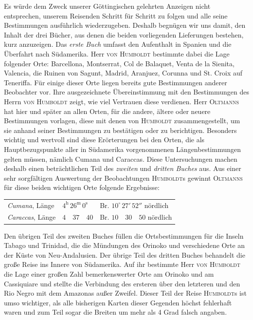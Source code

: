 Es würde dem Zweck unserer Göttingischen gelehrten Anzeigen nicht entsprechen, unserem Reisenden Schritt für Schritt zu folgen und alle seine Bestimmungen ausführlich wiederzugeben. Deshalb begnügen wir uns damit, den Inhalt der drei Bücher, aus denen die beiden vorliegenden Lieferungen bestehen, kurz anzuzeigen. Das \emph{erste Buch} umfasst den Aufenthalt in Spanien und die Überfahrt nach Südamerika. Herr \textsc{von Humboldt} bestimmte dabei die Lage folgender Orte: Barcellona, Montserrat, Col de Balaquet, Venta de la Sienita, Valencia, die Ruinen von Sagunt, Madrid, Aranjuez, Corunna und St. Croix auf Teneriffa. Für einige dieser Orte liegen bereits gute Bestimmungen anderer Beobachter vor. Ihre ausgezeichnete Übereinstimmung mit den Bestimmungen des Herrn \textsc{von Humboldt} zeigt, wie viel Vertrauen diese verdienen. Herr \textsc{Oltmanns} hat hier und später an allen Orten, für die andere, ältere oder neuere Bestimmungen vorlagen, diese mit denen von \textsc{Humboldt} zusammengestellt, um sie anhand seiner Bestimmungen zu bestätigen oder zu berichtigen. Besonders wichtig und wertvoll sind diese Erörterungen bei den Orten, die als Hauptbezugspunkte aller in Südamerika vorgenommenen Längenbestimmungen gelten müssen, nämlich Cumana und Caraccas. Diese Untersuchungen machen deshalb einen beträchtlichen Teil des \emph{zweiten} und \emph{dritten Buches} aus. Aus einer sehr sorgfältigen Auswertung der Beobachtungen \textsc{Humboldt}s gewinnt \textsc{Oltmanns} für diese beiden wichtigen Orte folgende Ergebnisse:
\begin{center} \begin{tabular}{@{}lll@{}} \textit{Cumana}, Länge & $4^{\mathrm h}\,26^{\mathrm m}\,0^{\mathrm s}$ & Br. $10^\circ\,27'\,52''$ nördlich \\ \textit{Caraccas}, Länge & $4\quad 37\quad 40$ & Br. $10\quad 30\quad 50$ nördlich \\ \end{tabular} \end{center}
\noindent Den übrigen Teil des zweiten Buches füllen die Ortsbestimmungen für die Inseln Tabago und Trinidad, die die Mündungen des Orinoko und verschiedene Orte an der Küste von Neu-Andalusien. Der übrige Teil des dritten Buches behandelt die große Reise ins Innere von Südamerika. Auf ihr bestimmte Herr \textsc{von Humboldt} die Lage einer großen Zahl bemerkenswerter Orte am Orinoko und am Cassiquiare und stellte die Verbindung des ersteren über den letzteren und den Rio Negro mit dem Amazonas außer Zweifel. Dieser Teil der Reise \textsc{Humboldt}s ist umso wichtiger, als alle bisherigen Karten dieser Gegenden höchst fehlerhaft waren und zum Teil sogar die Breiten um mehr als 4 Grad falsch angaben.

